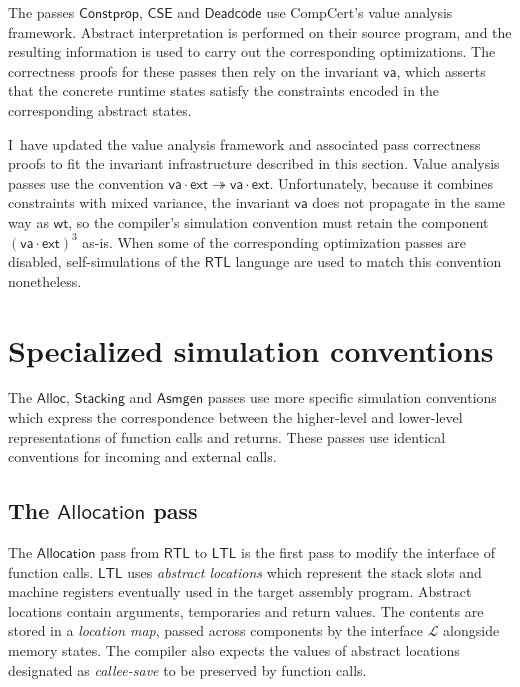 \documentclass[11pt,oneside]{book}
\theoremstyle{definition}
\newcommand{\kw}[1]{\ensuremath{ \mathsf{#1} }}
\begin{document}
The passes
$\kw{Constprop}$, $\kw{CSE}$ and $\kw{Deadcode}$
use CompCert's value analysis framework.
Abstract interpretation is performed %
on their source program,
and the resulting information is used to carry out
the corresponding optimizations.
The correctness proofs for these passes then rely
on the invariant $\kw{va}$,
which asserts that the concrete runtime states
satisfy the constraints encoded in the corresponding
abstract states.

I~have updated the value analysis framework
and associated pass correctness proofs
to fit the invariant infrastructure described in this section.
Value analysis passes use the convention
$\kw{va} \cdot \kw{ext} \twoheadrightarrow \kw{va} \cdot \kw{ext}$.
Unfortunately,
because it combines constraints with mixed variance,
the invariant $\kw{va}$ does not propagate in the same way as $\kw{wt}$,
so the compiler's simulation convention must retain
the component $(\kw{va} \cdot \kw{ext})^3$ as-is.
When some of the corresponding optimization passes are disabled,
self-simulations of the $\kw{RTL}$ language
are used
to match this convention nonetheless.



\section{Specialized simulation conventions} \label{sec:backend} %

The \kw{Alloc}, \kw{Stacking} and \kw{Asmgen} passes
use more specific simulation conventions
which express the correspondence between
the higher-level and lower-level representations
of function calls and returns.
These passes use identical conventions for
incoming and external calls.

\subsection{The \kw{Allocation} pass} \label{sec:alloc} %

The \kw{Allocation} pass from \kw{RTL} to \kw{LTL}
is the first pass to modify the interface of function calls.
\kw{LTL} uses \emph{abstract locations}
which represent the stack slots and machine registers
eventually used in the target assembly program.
Abstract locations contain arguments, temporaries and return values.
The contents are stored in a \emph{location map},
passed across components by the interface $\mathcal{L}$
alongside memory states.
The compiler also expects the values of
abstract locations designated as \emph{callee-save}
to be preserved by function calls.
\end{document}
